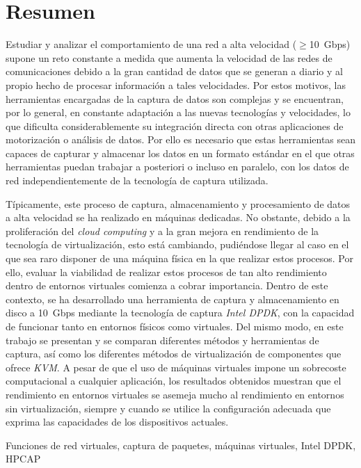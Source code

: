 \chapter*{Resumen}

\begin{abstractEs}
Estudiar y analizar el comportamiento de una red a alta velocidad ($\geq$10~Gbps) supone un reto constante a medida que aumenta la velocidad de las redes de comunicaciones debido a la gran cantidad de datos que se generan a diario y al propio hecho de procesar información a tales velocidades.
Por estos motivos, las herramientas encargadas de la captura de datos son complejas y se encuentran, por lo general, en constante adaptación a las nuevas tecnologías y  velocidades, lo que dificulta considerablemente su integración directa con otras aplicaciones de motorización o análisis de datos.
Por ello es necesario que estas herramientas sean capaces de capturar y almacenar los datos en un formato estándar en el que otras herramientas puedan trabajar a posteriori o incluso en paralelo, con los datos de red independientemente de la tecnología de captura utilizada.

Típicamente, este proceso de captura, almacenamiento y procesamiento de datos a alta velocidad se ha realizado en máquinas dedicadas. No obstante, debido a la proliferación del \textit{cloud computing} y a la gran mejora en rendimiento de la tecnología de virtualización, esto está cambiando, pudiéndose llegar al caso en el que sea raro disponer de una máquina física en la que realizar estos procesos. Por ello, evaluar la viabilidad de realizar estos procesos de tan alto rendimiento dentro de entornos virtuales comienza a cobrar importancia.
Dentro de este contexto, se ha desarrollado una herramienta de captura y almacenamiento en disco a 10~Gbps mediante la tecnología de captura \textit{Intel DPDK}, con la capacidad de funcionar tanto en entornos físicos como virtuales. Del mismo modo, en este trabajo se presentan y se comparan diferentes métodos y herramientas de captura, así como los diferentes métodos de virtualización de componentes que ofrece \textit{KVM}.
A pesar de que el uso de máquinas virtuales impone un sobrecoste computacional a cualquier aplicación, los resultados obtenidos muestran que el rendimiento en entornos virtuales se asemeja mucho al rendimiento en entornos sin virtualización, siempre y cuando se utilice la configuración adecuada que exprima las capacidades de los dispositivos actuales.
\end{abstractEs}

\begin{keywordsEs}
Funciones de red virtuales, captura de paquetes, máquinas virtuales, Intel DPDK, HPCAP
\end{keywordsEs}
